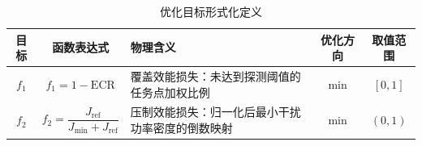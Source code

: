 \begin{table}[h]
\centering
\caption{优化目标形式化定义}
\label{tab:objectives}
\begin{tabular}{ccp{5.5cm}cc}
\toprule
目标 & 函数表达式 & 物理含义 & 优化方向 & 取值范围 \\
\midrule
$f_1$ & $f_1 = 1 - \mathrm{ECR}$ & 覆盖效能损失：未达到探测阈值的任务点加权比例 & $\min$ & $[0, 1]$ \\
$f_2$ & $f_2 = \dfrac{J_{\mathrm{ref}}}{J_{\min} + J_{\mathrm{ref}}}$ & 压制效能损失：归一化后最小干扰功率密度的倒数映射 & $\min$ & $(0, 1)$ \\
\bottomrule
\end{tabular}
\end{table}
